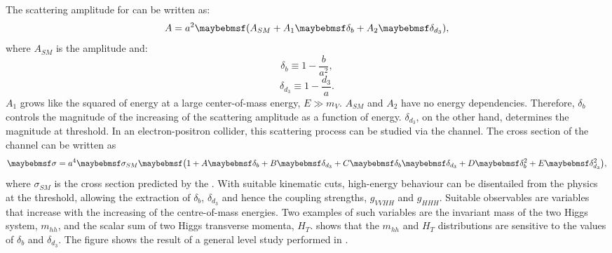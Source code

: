 The scattering amplitude for  can be written as:
\begin{equation}
A = a^2\parenths{A_{SM} + A_1\delta_b + A_2\delta_{d_3}},
\end{equation}
where $A_{SM}$ is the \SM amplitude and:
\begin{equation}
\delta_b \equiv 1 - \frac{b}{a^2},
\end{equation}
\begin{equation}
\delta_{d_3} \equiv 1 - \frac{d_3}{a}.
\end{equation}
$A_1$ grows like the squared of energy at a large center-of-mass energy, $E\gg{m_V}$. $A_{SM}$ and $A_2$ have no energy dependencies. Therefore, $\delta_b$ controls the magnitude of the increasing of the scattering amplitude as a function of energy. $\delta_{d_3}$, on the other hand, determines the magnitude at threshold. In an electron-positron collider, this scattering process can be studied via the  channel. The cross section of the channel can be written as
\begin{equation}
\label{eq:theoryGeneralHiggsCrossSection}
\sigma = a^4\sigma_{SM}\parenths{1 + A\delta_b + B\delta_{d_3} + C\delta_b\delta_{d_3} + D\delta_b^2 + E\delta_{d_3}^2},
\end{equation}
where $\sigma_{SM}$ is the cross section predicted by the \SM. With suitable kinematic cuts, high-energy behaviour can be disentailed from the physics at the threshold, allowing the extraction of $\delta_{b}$, $\delta_{d_3}$ and hence the coupling strengths, $g_{VVHH}$ and $g_{HHH}$. Suitable observables are variables that increase with the increasing of the centre-of-mass energies. Two examples of such variables are the invariant mass of the two Higgs system, $m_{hh}$, and the scalar sum of two Higgs transverse momenta, $H_T$.  shows that the $m_{hh}$ and $H_T$ distributions are sensitive to the values of $\delta_{b}$ and $\delta_{d_3}$. The figure shows the result of a general level study performed in \cite{Contino:2013gna}.

